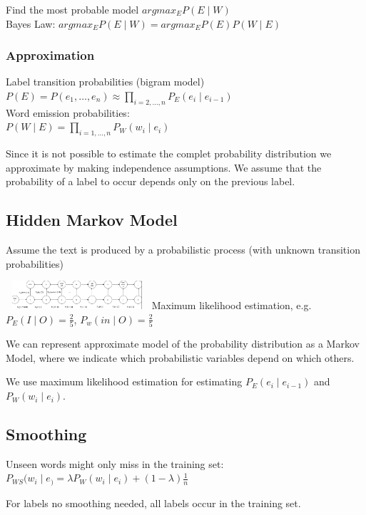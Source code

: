 Find the most probable model $ argmax_E P(E \mid W) $ \\
Bayes Law: $ argmax_E P(E \mid W) = argmax_E P(E)P(W \mid E) $

\subsubsection{Approximation}
Label transition probabilities (bigram model) \\
$ P(E) = P(e_1, \ldots, e_n) \approx \prod_{i = 2, \ldots, n} P_E(e_i
\mid e_{i - 1}) $ \\

Word emission probabilities: \\
$ P(W \mid E) = \prod_{i = 1, \ldots, n} P_W(w_i \mid e_i) $

Since it is not possible to estimate the complet probability
distribution we approximate by making independence assumptions. We
assume that the probability of a label to occur depends only on the
previous label.

\subsection{Hidden Markov Model}
Assume the text is produced by a probabilistic process (with unknown
transition probabilities)

\includegraphics[width=200px, height=40px]{hmm}
Maximum likelihood estimation, e.g.\ \\
$ P_E(I \mid O) = \frac{2}{5} $, $ P_w(in \mid O) = \frac{2}{5} $

We can represent approximate model of the probability distribution as
a Markov Model, where we indicate which probabilistic variables depend
on which others.

We use maximum likelihood estimation for estimating $ P_E(e_i \mid
e_{i - 1})$ and $ P_W(w_i \mid e_i) $.

\subsection{Smoothing}
Unseen words might only miss in the training set: \\
$ P_{WS} (w_i \mid e_) = \lambda P_W(w_i \mid e_i) + (1- \lambda)
\frac{1}{n} $

For labels no smoothing needed, all labels occur in the training set.

